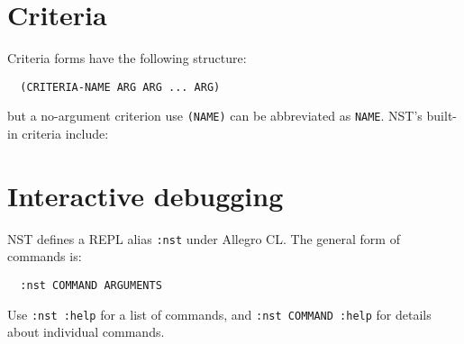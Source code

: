 \documentclass{article}
\newenvironment{criteria}%
{\begin{list}{}
    {\setlength{\labelwidth}{0pt}
     \setlength{\leftmargin}{2em}
     \setlength{\rightmargin}{1em}
     \setlength{\itemindent}{0em}}}%
  {\end{list}}
\def\criterion#1#2#3#4{\item[\bfseries #1] #4\par
  \emph{Syntax:}~~\texttt{#2}\\ \emph{Applicable to:}~~#3}
\begin{document}
\section*{Criteria}
\label{sec:criteria}
Criteria forms have the following structure:
\begin{verbatim}
  (CRITERIA-NAME ARG ARG ... ARG)
\end{verbatim}
but a no-argument criterion use \texttt{(NAME)} can be abbreviated as
\texttt{NAME}.  NST's built-in criteria include:
\def\criteriaGroup#1#2{\par\textbf{#1.}\begin{criteria}}
\def\secText#1{}
\def\endcriteriaGroup{\end{criteria}}
\def\criteriaDoc#1#2#3#4#5#6#7#8{\criterion{#2}{#3}{#5}{#4}}
\def\noExpl{}
\def\hasExpl#1{}
\def\manualOrRef#1#2{#2}


\section*{Interactive debugging}
\label{sec:interact}
NST defines a REPL alias \texttt{:nst} under Allegro CL.  The general
form of commands is:
\begin{verbatim}
  :nst COMMAND ARGUMENTS
\end{verbatim}
Use \mbox{\texttt{:nst :help}} for a list of commands, and
\mbox{\texttt{:nst COMMAND :help}} for details about individual
commands.
\end{document}
